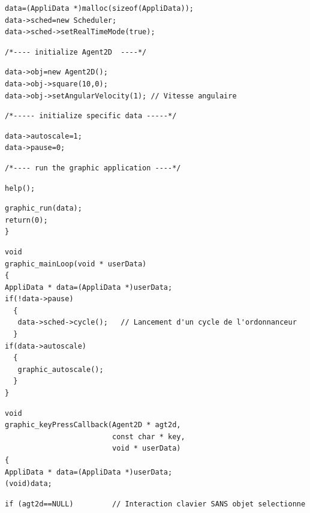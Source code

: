 \documentclass[12pt]{article}
\begin{document}
\begin{small}
\begin{verbatim}
\end{verbatim}
\vspace{-0.4cm}
\begin{verbatim}
data=(AppliData *)malloc(sizeof(AppliData));
data->sched=new Scheduler;
data->sched->setRealTimeMode(true);
\end{verbatim}
\vspace{-0.4cm}
\begin{verbatim}
/*---- initialize Agent2D  ----*/
\end{verbatim}
\vspace{-0.4cm}
\begin{verbatim}
data->obj=new Agent2D();
data->obj->square(10,0);
data->obj->setAngularVelocity(1); // Vitesse angulaire
\end{verbatim}
\begin{verbatim}
/*----- initialize specific data -----*/
\end{verbatim}
\vspace{-0.4cm}
\begin{verbatim}
data->autoscale=1;
data->pause=0;
\end{verbatim}
\newpage
\begin{verbatim}
/*---- run the graphic application ----*/
\end{verbatim}
\vspace{-0.6cm}
\begin{verbatim}
help();
\end{verbatim}
\vspace{-0.6cm}
\begin{verbatim}
graphic_run(data);
return(0);
}
\end{verbatim}
\vspace{-0.6cm}
\begin{verbatim}
void
graphic_mainLoop(void * userData)
{
AppliData * data=(AppliData *)userData;
if(!data->pause)
  {
   data->sched->cycle();   // Lancement d'un cycle de l'ordonnanceur
  }
if(data->autoscale)
  {
   graphic_autoscale();
  }
}
\end{verbatim}
\vspace{-0.6cm}
\begin{verbatim}
void
graphic_keyPressCallback(Agent2D * agt2d,
                         const char * key,
                         void * userData)
{
AppliData * data=(AppliData *)userData;
(void)data;
\end{verbatim}
\vspace{-0.6cm}
\begin{verbatim}
if (agt2d==NULL)         // Interaction clavier SANS objet selectionne

\end{verbatim}
\end{small}
\end{document}
